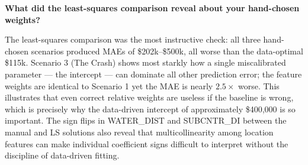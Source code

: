 \documentclass[11pt]{article}
\begin{document}
\textbf{What did the least-squares comparison reveal about your hand-chosen weights?}

The least-squares comparison was the most instructive check: all three hand-chosen scenarios produced MAEs of \$202k--\$500k, all worse than the data-optimal \$115k. Scenario 3 (The Crash) shows most starkly how a single miscalibrated parameter --- the intercept --- can dominate all other prediction error; the feature weights are identical to Scenario 1 yet the MAE is nearly $2.5\times$ worse. This illustrates that even correct relative weights are useless if the baseline is wrong, which is precisely why the data-driven intercept of approximately \$400,000 is so important. The sign flips in WATER\_DIST and SUBCNTR\_DI between the manual and LS solutions also reveal that multicollinearity among location features can make individual coefficient signs difficult to interpret without the discipline of data-driven fitting.
\end{document}
